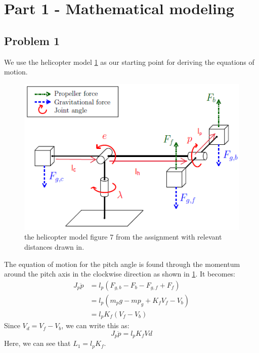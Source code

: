 
\section{Part 1 - Mathematical modeling}
\subsection{Problem 1}

We use the helicopter model \cref{fig:helicopter_model} as our starting point for deriving the equations of motion.
\begin{figure}[hbp]
\caption{the helicopter model figure 7 from the assignment \cite[p.12]{assignment} with relevant distances drawn in.}
\label{fig:helicopter_model}
\includegraphics[width=\textwidth]{images/helicopter_model}
\end{figure}

The equation of motion for the pitch angle is found through the momentum around the pitch axis in the clockwise direction as shown in \cref{fig:helicopter_model}. It becomes:
\begin{align*}
J_p\ddot{p} &= l_p(F_{g,b} - F_b - F_{g,f} + F_f) \\
						&= l_p(m_pg - mp_g + K_fV_f - V_b) \\
						&= l_pK_f(V_f-V_b)
\end{align*}
Since $V_d = V_f-V_b$, we can write this as:
\begin{equation}
J_p\ddot{p} = l_pK_fVd
\end{equation}
Here, we can see that $L_1 = l_pK_f$.

